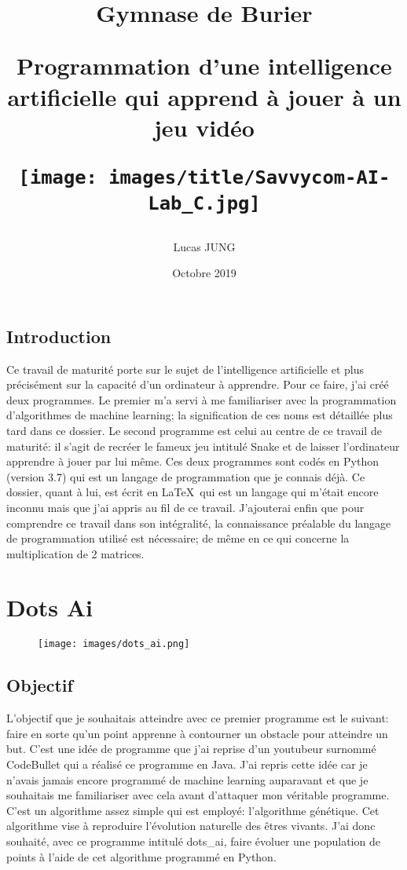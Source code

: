 \documentclass[12pt, a4paper, openany]{book}
\title{\begin{center}\large{Gymnase de Burier}\end{center}\begin{center}Programmation d'une intelligence artificielle qui apprend à jouer à un jeu vidéo\end{center}
\begin{center}\texttt{[image: images/title/Savvycom-AI-Lab\_C.jpg]}\end{center}}
\author{Lucas JUNG}
\date{Octobre 2019}
\begin{document}
\ActivateVerbatimLigatures
\large

\maketitle

{\pagestyle{plain}
\tableofcontents
\cleardoublepage}

\leavevmode
\vspace{-0.5cm}
\setcounter{page}{1}
\section*{Introduction}
Ce travail de maturité porte sur le sujet de l’intelligence artificielle et plus précisément sur la capacité d'un ordinateur à apprendre. Pour ce faire, j'ai créé deux programmes. Le premier m'a servi à me familiariser avec la programmation d'algorithmes de \og machine learning\fg{}; la signification de ces noms est détaillée plus tard dans ce dossier. Le second programme est celui au centre de ce travail de maturité: il s'agit de recréer le fameux jeu intitulé \og Snake\fg{} et de laisser l'ordinateur apprendre à jouer par lui même. Ces deux programmes sont codés en Python (version 3.7) qui est un langage de programmation que je connais déjà. Ce dossier, quant à lui, est écrit en \LaTeX\ qui est un langage qui m'était encore inconnu mais que j'ai appris au fil de ce travail. J'ajouterai enfin que pour comprendre ce travail dans son intégralité, la connaissance préalable du langage de programmation utilisé est nécessaire; de même en ce qui concerne la multiplication de 2 matrices.
\newpage

\chapter{Dots Ai}\label{ch:dots-ai}
\label{r:1}
\begin{figure}[ht]
    \centering
    \texttt{[image: images/dots\_ai.png]}
\end{figure}
\newpage

\section{Objectif}
L'objectif que je souhaitais atteindre avec ce premier programme est le suivant: faire en sorte qu'un point apprenne à contourner un obstacle pour atteindre un but. C'est une idée de programme que j'ai reprise d'un youtubeur surnommé CodeBullet qui a réalisé ce programme en Java. J'ai repris cette idée car je n'avais jamais encore programmé de \og machine learning\fg{} auparavant et que je souhaitais me familiariser avec cela avant d'attaquer mon véritable programme. C'est un algorithme assez simple qui est employé: l’algorithme génétique. Cet algorithme vise à reproduire l'évolution naturelle des êtres vivants. J'ai donc souhaité, avec ce programme intitulé dots\_ai, faire évoluer une population de points à l'aide de cet algorithme programmé en Python.
\end{document}
